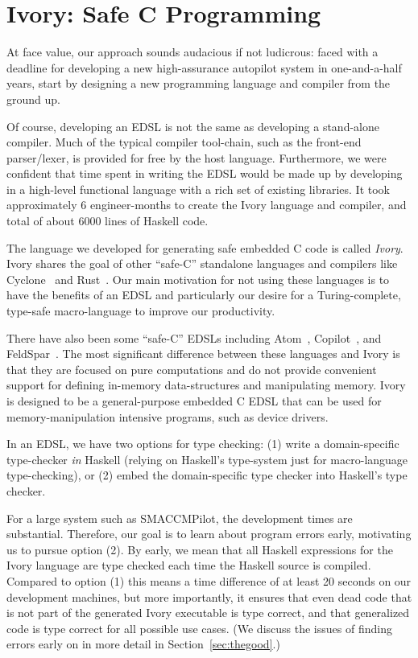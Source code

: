 \section{Ivory: Safe C Programming}
\label{sec:ivory}

At face value, our approach sounds audacious if not ludicrous: faced with a
deadline for developing a new high-assurance autopilot system in one-and-a-half
years, start by designing a new programming language and compiler from the
ground up.

Of course, developing an EDSL is not the same as developing a stand-alone
compiler.  Much of the typical compiler tool-chain, such as the front-end
parser/lexer, is provided for free by the host language.  Furthermore, we were
confident that time spent in writing the EDSL would be made up by developing in
a high-level functional language with a rich set of existing libraries. It took
approximately 6 engineer-months to create the Ivory language and compiler, and
total of about 6000 lines of Haskell code.

The language we developed for generating safe embedded C code is called
\emph{Ivory}.  Ivory shares the goal of other ``safe-C'' standalone languages
and compilers like Cyclone~\cite{cyclone} and Rust~\cite{rust}.  Our main
motivation for not using these languages is to have the benefits of an EDSL and
particularly our desire for a Turing-complete, type-safe macro-language to
improve our productivity.

There have also been some ``safe-C'' EDSLs including Atom~\cite{atom},
Copilot~\cite{copilot}, and FeldSpar~\cite{feldspar1}.  The most significant
difference between these languages and Ivory is that they are focused on pure
computations and do not provide convenient support for defining in-memory
data-structures and manipulating memory.  Ivory is designed to be a
general-purpose embedded C EDSL that can be used for memory-manipulation
intensive programs, such as device drivers.

In an EDSL, we have two options for type checking: (1) write a domain-specific
type-checker \emph{in} Haskell (relying on Haskell's type-system just for
macro-language type-checking), or (2) embed the domain-specific type checker
into Haskell's type checker.

For a large system such as SMACCMPilot, the development times are substantial.
Therefore, our goal is to learn about program errors early, motivating us to
pursue option (2). By early, we mean that all Haskell expressions for the Ivory
language are type checked each time the Haskell source is compiled. Compared to
option (1) this means a time difference of at least 20 seconds on our
development machines, but more importantly, it ensures that even dead code that
is not part of the generated Ivory executable is type correct, and that
generalized code is type correct for all possible use cases. (We discuss the
issues of finding errors early on in more detail in Section~\ref{sec:thegood}.)


